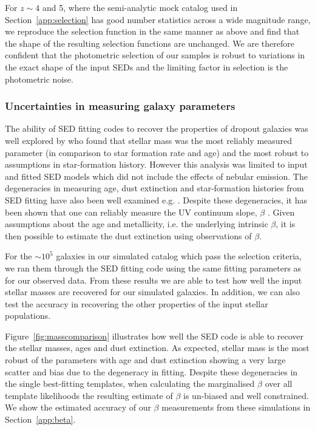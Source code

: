 For $z\sim 4$ and 5, where the semi-analytic mock catalog used in Section~\ref{app:selection} has good number statistics across a wide magnitude range, we reproduce the selection function in the same manner as above and find that the shape of the resulting selection functions are unchanged. We are therefore confident that the photometric selection of our samples is robust to variations in the exact shape of the input SEDs and the limiting factor in selection is the photometric noise.

\subsubsection{Uncertainties in measuring galaxy parameters}
The ability of SED fitting codes to recover the properties of dropout galaxies was well explored by \citet{2010ApJ...725.1644L} who found that stellar mass was the most reliably measured parameter (in comparison to star formation rate and age) and the most robust to assumptions in star-formation history. However this analysis was limited to input and fitted SED models which did not include the effects of nebular emission. The degeneracies in measuring age, dust extinction and star-formation histories from SED fitting have also been well examined e.g. \citet{2010A&A...515A..73S}. Despite these degeneracies, it has been shown that one can reliably measure the UV continuum slope, $\beta$ \citep{2012ApJ...756..164F,2013MNRAS.429.2456R}. Given assumptions about the age and metallicity, i.e. the underlying intrinsic $\beta$, it is then possible to estimate the dust extinction using observations of $\beta$.

For the $\sim 10^5$ galaxies in our simulated catalog which pass the selection criteria, we ran them through the SED fitting code using the same fitting parameters as for our observed data. From these results we are able to test how well the input stellar masses are recovered for our simulated galaxies. In addition, we can also test the accuracy in recovering the other properties of the input stellar populations.

Figure~\ref{fig:masscomparison} illustrates how well the SED code is able to recover the stellar masses, ages and dust extinction. As expected, stellar mass is the most robust of the parameters with age and dust extinction showing a very large scatter and bias due to the degeneracy in fitting. Despite these degeneracies in the single best-fitting templates, when calculating the marginalised $\beta$ over all template likelihoods the resulting estimate of $\beta$ is un-biased and well constrained. We show the estimated accuracy of our $\beta$ measurements from these simulations in Section~\ref{app:beta}.

